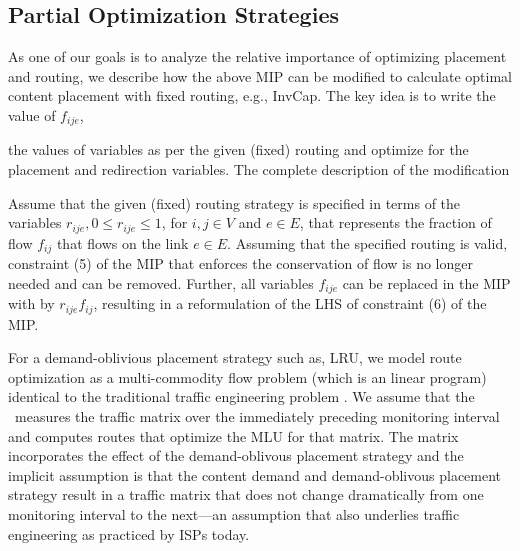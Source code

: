 \eat
{
\subsection{Partial Optimization Strategies}
\label{sec:mipinvcap}
As one of our goals is to analyze the relative importance of optimizing placement and routing, we describe how the above MIP can be modified to calculate optimal content placement with fixed routing, e.g., InvCap. The key idea is to write the value of $f_{ije}$, 

 the values of variables  as per the given (fixed) routing and optimize for the placement and redirection variables. 
  The complete description of the modification 

Assume that the given (fixed) routing strategy is specified in terms of the variables $ r_{ije}, 0 \leq r_{ije} \leq 1$, for $i,j \in V$ and $e \in E$, that represents the fraction of flow $f_{ij}$ that flows on the link $e \in E$. Assuming that the specified routing is valid, constraint (5) of the MIP that enforces the conservation of flow is no longer needed and can be removed. Further, all variables $f_{ije}$ can be replaced in the MIP with by $r_{ije} f_{ij}$, resulting in a reformulation of the LHS of constraint (6) of the MIP.

For a demand-oblivious placement strategy such as, LRU, we model route optimization as a multi-commodity flow problem (which is an linear program) identical to  the traditional traffic engineering problem \cite{fortz2000internet}. We assume that the \ncp\ measures the traffic matrix over the immediately preceding monitoring interval and computes routes that optimize the MLU for that matrix. The matrix incorporates the effect of the demand-oblivous placement strategy and the implicit assumption is that the content demand and demand-oblivous placement strategy result in a traffic matrix that does not change dramatically from one monitoring interval to the next---an assumption that also underlies traffic engineering as practiced by ISPs today. 
}




%
%
%


